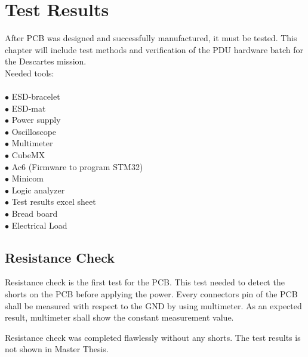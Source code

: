 \chapter{Test Results \label{6}}
After PCB was designed and successfully manufactured, it must be tested.
This chapter will include test methods and verification of the PDU hardware batch for the Descartes mission.
\\
Needed tools:\\ \\
$\bullet$ ESD-bracelet\\
$\bullet$ ESD-mat\\
$\bullet$ Power supply\\
$\bullet$ Oscilloscope\\
$\bullet$ Multimeter\\
$\bullet$ CubeMX\\
$\bullet$ Ac6 (Firmware to program STM32)\\
$\bullet$ Minicom\\
$\bullet$ Logic analyzer\\
$\bullet$ Test results excel sheet\\
$\bullet$ Bread board\\
$\bullet$ Electrical Load\\



\section{Resistance Check}


Resistance check is the first test for the PCB. This test needed to detect the shorts on the PCB before applying the power.
Every connectors pin of the PCB shall be measured with respect to the GND by using multimeter. As an expected result, multimeter shall show the constant measurement value.

Resistance check was completed flawlessly without any shorts. The test results is not shown in Master Thesis. \\



